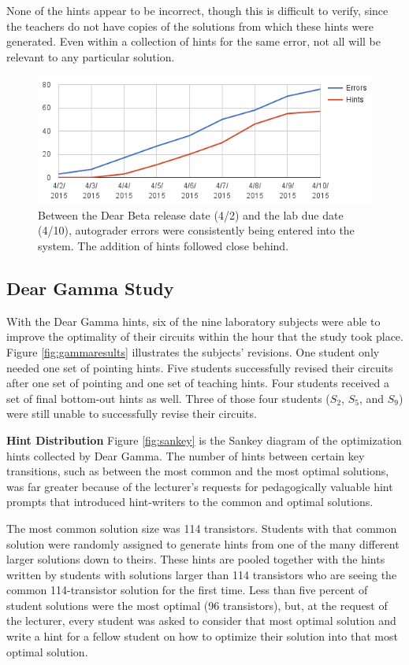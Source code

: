 None of the hints appear to be incorrect, though this is difficult to verify, since the teachers do not have copies of the solutions from which these hints were generated. Even within a collection of hints for the same error, not all will be relevant to any particular solution.


\begin{figure}
\centering
\includegraphics[width=1.0\columnwidth]{Body/figures/classoverflow/cumulativeErrorsAndHints.png}
\caption{Between the Dear Beta release date (4/2) and the lab due date (4/10), autograder errors were consistently being entered into the system. The addition of hints followed close behind.}
\label{fig:betaengagement}
\end{figure}


\subsection{Dear Gamma Study}

With the Dear Gamma hints, six of the nine laboratory subjects were able to improve the optimality of their circuits within the hour that the study took place. Figure \ref{fig:gammaresults} illustrates the subjects' revisions. One student only needed one set of pointing hints. Five students successfully revised their circuits after one set of pointing and one set of teaching hints. Four students received a set of final bottom-out hints as well. Three of those four students ($S_2$, $S_5$, and $S_9$) were still unable to successfully revise their circuits. 

{\bf Hint Distribution} Figure \ref{fig:sankey} is the Sankey diagram of the optimization hints collected by Dear Gamma. The number of hints between certain key transitions, such as between the most common and the most optimal solutions, was far greater because of the lecturer's requests for pedagogically valuable hint prompts that introduced hint-writers to the common and optimal solutions. 

The most common solution size was 114 transistors. Students with that common solution were randomly assigned to generate hints from one of the many different larger solutions down to theirs. These hints are pooled together with the hints written by students with solutions larger than 114 transistors who are seeing the common 114-transistor solution for the first time. Less than five percent of student solutions were the most optimal (96 transistors), but, at the request of the lecturer, every student was asked to consider that most optimal solution and write a hint for a fellow student on how to optimize their solution into that most optimal solution.

